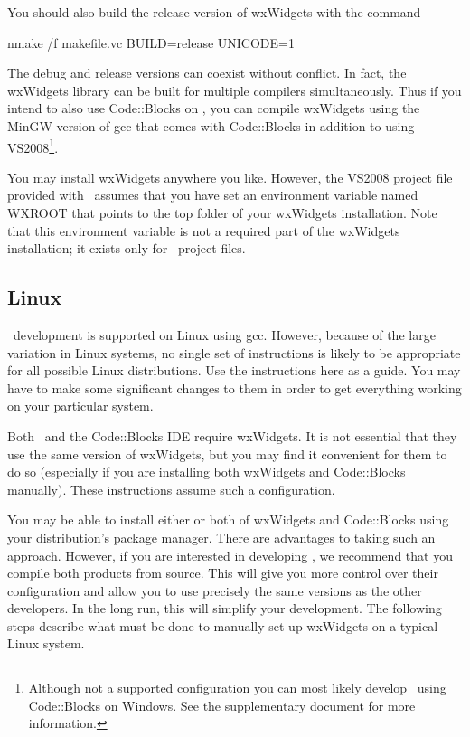 You should also build the release version of wxWidgets with the command

\begin{commands}
nmake /f makefile.vc BUILD=release UNICODE=1
\end{commands}

The debug and release versions can coexist without conflict. In fact, the wxWidgets library can be built for multiple compilers simultaneously. Thus if you intend to also use Code::Blocks on \MapEditor, you can compile wxWidgets using the MinGW version of gcc that comes with Code::Blocks in addition to using VS2008\footnote{Although not a supported configuration you can most likely develop \MapEditor\ using Code::Blocks on Windows. See the supplementary document  for more information.}.

You may install wxWidgets anywhere you like. However, the VS2008 project file provided with \MapEditor\ assumes that you have set an environment variable named WXROOT that points to the top folder of your wxWidgets installation. Note that this environment variable is not a required part of the wxWidgets installation; it exists only for \MapEditor\ project files.

\subsection{Linux}

\MapEditor\ development is supported on Linux using gcc. However, because of the large variation in Linux systems, no single set of instructions is likely to be appropriate for all possible Linux distributions. Use the instructions here as a guide. You may have to make some significant changes to them in order to get everything working on your particular system.

Both \MapEditor\ and the Code::Blocks IDE require wxWidgets. It is not essential that they use the same version of wxWidgets, but you may find it convenient for them to do so (especially if you are installing both wxWidgets and Code::Blocks manually). These instructions assume such a configuration.

You may be able to install either or both of wxWidgets and Code::Blocks using your distribution's package manager. There are advantages to taking such an approach. However, if you are interested in developing \VTank, we recommend that you compile both products from source. This will give you more control over their configuration and allow you to use precisely the same versions as the other \VTank developers. In the long run, this will simplify your development. The following steps describe what must be done to manually set up wxWidgets on a typical Linux system.

